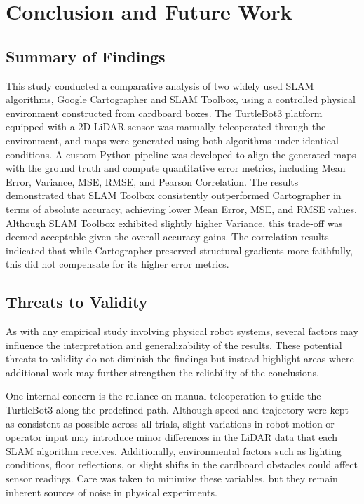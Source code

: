 \documentclass[runningheads,11pt]{llncs_bigfont_absbib}
\begin{document}
\section{Conclusion and Future Work}
\subsection{Summary of Findings}
This study conducted a comparative analysis of two widely used SLAM algorithms, Google Cartographer and SLAM Toolbox, using a controlled physical environment constructed from cardboard boxes. The TurtleBot3 platform equipped with a 2D LiDAR sensor was manually teleoperated through the environment, and maps were generated using both algorithms under identical conditions. A custom Python pipeline was developed to align the generated maps with the ground truth and compute quantitative error metrics, including Mean Error, Variance, MSE, RMSE, and Pearson Correlation. The results demonstrated that SLAM Toolbox consistently outperformed Cartographer in terms of absolute accuracy, achieving lower Mean Error, MSE, and RMSE values. Although SLAM Toolbox exhibited slightly higher Variance, this trade-off was deemed acceptable given the overall accuracy gains. The correlation results indicated that while Cartographer preserved structural gradients more faithfully, this did not compensate for its higher error metrics.

\subsection{Threats to Validity}

As with any empirical study involving physical robot systems, several factors may influence the
interpretation and generalizability of the results. These potential threats to validity do not diminish
the findings but instead highlight areas where additional work may further strengthen the reliability
of the conclusions.

One internal concern is the reliance on manual teleoperation to guide the
TurtleBot3 along the predefined path. Although speed and trajectory were kept as consistent as
possible across all trials, slight variations in robot motion or operator input may introduce minor
differences in the LiDAR data that each SLAM algorithm receives. Additionally, environmental
factors such as lighting conditions, floor reflections, or slight shifts in the cardboard obstacles
could affect sensor readings. Care was taken to minimize these variables, but they remain inherent
sources of noise in physical experiments.
\end{document}
